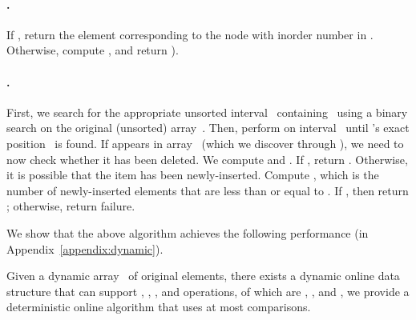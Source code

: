 \paragraph{.} If , return the element 
corresponding to the node with inorder number  
in . Otherwise, compute , 
and return ).

\paragraph{.} First, we search for the appropriate 
unsorted interval~ containing~ using a binary search 
on the original (unsorted) array~. Then, perform  
on interval~ until 's exact position~ is found. If  
appears in array~ (which we discover through \search), we 
need to now check whether it has been deleted. We compute 
 and . If , 
return . Otherwise, it is possible that the item has been 
newly-inserted. Compute , which is the number of 
newly-inserted elements that are less than or equal to . 
If , then return ; otherwise, return failure.



We show that the above algorithm achieves the following performance 
(in Appendix~\ref{appendix:dynamic}).

\begin{theorem}
\label{thm:dynamic-internal}
Given a dynamic array~ of  original elements, there exists a dynamic online data structure that can support  , , , and  operations, of which  are , , and , we provide a deterministic online algorithm that uses at most  comparisons.
\end{theorem}

